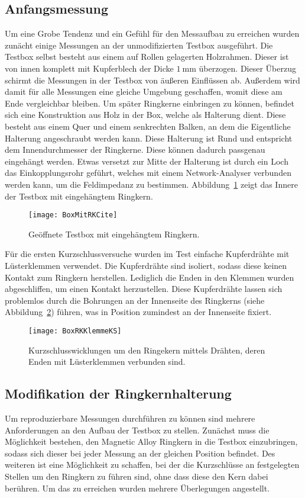 \subsection{Anfangsmessung}
Um eine Grobe Tendenz und ein Gef\"uhl f\"ur den Messaufbau zu erreichen wurden zun\"acht einige Messungen an der unmodifizierten Testbox ausgef\"uhrt. Die Testbox selbst besteht aus einem auf Rollen gelagerten Holzrahmen. Dieser ist von innen komplett mit Kupferblech der Dicke $\SI{1}{\milli\meter}$ \"uberzogen. Dieser Überzug schirmt die Messungen in der Testbox von \"au\ss{}eren Einfl\"ussen ab. Au\ss{}erdem wird damit f\"ur alle Messungen eine gleiche Umgebung geschaffen, womit diese am Ende vergleichbar bleiben. Um sp\"ater Ringkerne einbringen zu k\"onnen, befindet sich eine Konstruktion aus Holz in der Box, welche als Halterung dient. Diese besteht aus einem Quer und einem senkrechten Balken, an dem die Eigentliche Halterung angeschraubt werden kann. Diese Halterung ist Rund und entspricht dem Innendurchmesser der Ringkerne. Diese k\"onnen dadurch passgenau eingeh\"angt werden. Etwas versetzt zur Mitte der Halterung ist durch ein Loch das Einkopplungsrohr gef\"uhrt, welches mit einem Network-Analyser verbunden werden kann, um die Feldimpedanz zu bestimmen. Abbildung~\ref{fig:leereBox} zeigt das Innere der Testbox mit eingeh\"angtem Ringkern.
\par
\begin{figure}[htb]
		\centering
		\texttt{[image: BoxMitRKCite]}
		\caption{Ge\"offnete Testbox mit eingeh\"angtem Ringkern.~\cite{harzheim2016modeling}}
		\label{fig:leereBox}
\end{figure}
F\"ur die ersten Kurzschlussversuche wurden im Test einfache Kupferdr\"ahte mit L\"usterklemmen verwendet. Die Kupferdr\"ahte sind isoliert, sodass diese keinen Kontakt zum Ringkern herstellen. Lediglich die Enden in den Klemmen wurden abgeschliffen, um einen Kontakt herzustellen. Diese Kupferdr\"ahte lassen sich problemlos durch die Bohrungen an der Innenseite des Ringkerns (siehe Abbildung~\ref{fig:innenKern}) f\"uhren, was in Position zumindest an der Innenseite fixiert.
\par
\begin{figure}[htb]
		\centering
		\texttt{[image: BoxRKKlemmeKS]}
		\caption{Kurzschlusswicklungen um den Ringekern mittels Dr\"ahten, deren Enden mit L\"usterklemmen verbunden sind.}
		\label{fig:innenKern}
\end{figure}


\subsection{Modifikation der Ringkernhalterung}
Um reproduzierbare Messungen durchf\"uhren zu k\"onnen sind mehrere Anforderungen an den Aufbau der Testbox zu stellen. Zun\"achst muss die M\"oglichkeit bestehen, den Magnetic Alloy Ringkern in die Testbox einzubringen, sodass sich dieser bei jeder Messung an der gleichen Position befindet. Des weiteren ist eine M\"oglichkeit zu schaffen, bei der die Kurzschl\"usse an festgelegten  Stellen um den Ringkern zu f\"uhren sind, ohne dass diese den Kern dabei ber\"uhren. Um das zu erreichen wurden mehrere \"Uberlegungen angestellt.


